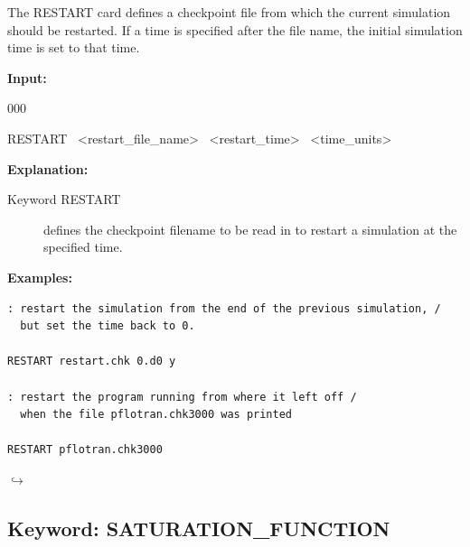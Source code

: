 \documentclass[12pt]{article}
\newcommand\return{{\hfill$\hookrightarrow$}}
\begin{document}
The RESTART card defines a checkpoint file from which the current simulation should be restarted.  If a time is specified after the file name, the initial simulation time is set to that time.

{\noindent\bf Input:}

\begin{deflist}{000}
\item[RESTART] \ <restart\_file\_name> \ <restart\_time> \ <time\_units>
\end{deflist}

{\noindent\bf Explanation:}
\begin{description}
\item[Keyword RESTART] defines the checkpoint filename to be read in to restart a simulation at the specified time.
\end{description}

{\noindent\bf
Examples:}

\begin{verbatim}
: restart the simulation from the end of the previous simulation, /
  but set the time back to 0.

RESTART restart.chk 0.d0 y

: restart the program running from where it left off /
  when the file pflotran.chk3000 was printed

RESTART pflotran.chk3000

\end{verbatim}

\hyperlink{target_key}{\return}


\newpage
\protect\hypertarget{target_sat}{}

\subsection{Keyword: SATURATION\_FUNCTION}

\end{document}

